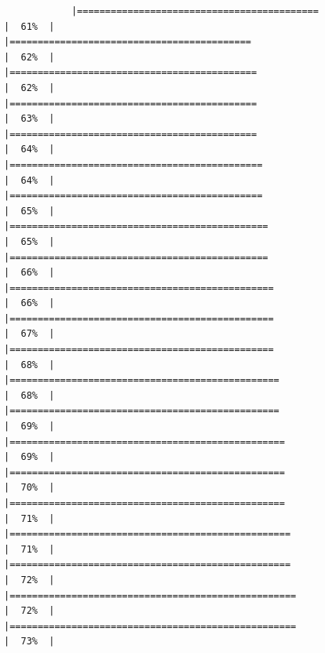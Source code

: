 \documentclass[
]{article}
\begin{document}
\begin{verbatim}
            |===========================================                           |  61%  |                                                                              |===========================================                           |  62%  |                                                                              |============================================                          |  62%  |                                                                              |============================================                          |  63%  |                                                                              |============================================                          |  64%  |                                                                              |=============================================                         |  64%  |                                                                              |=============================================                         |  65%  |                                                                              |==============================================                        |  65%  |                                                                              |==============================================                        |  66%  |                                                                              |===============================================                       |  66%  |                                                                              |===============================================                       |  67%  |                                                                              |===============================================                       |  68%  |                                                                              |================================================                      |  68%  |                                                                              |================================================                      |  69%  |                                                                              |=================================================                     |  69%  |                                                                              |=================================================                     |  70%  |                                                                              |=================================================                     |  71%  |                                                                              |==================================================                    |  71%  |                                                                              |==================================================                    |  72%  |                                                                              |===================================================                   |  72%  |                                                                              |===================================================                   |  73%  |                                                                   
\end{verbatim}
\end{document}

